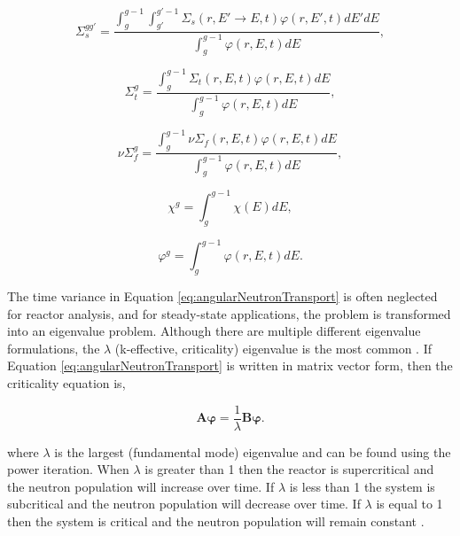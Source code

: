 \begin{equation}
    \Sigma_{s}^{gg'} = \frac{\int_{g}^{g-1}\int_{g'}^{g'-1}\Sigma_{s}(r,E'\rightarrow E,t)\varphi(r,E',t) dE'dE}{\int_{g}^{g-1}\varphi(r,E,t) dE},
\end{equation}

\begin{equation}
    \Sigma_{t}^{g} = \frac{\int_{g}^{g-1}\Sigma_{t}(r,E,t)\varphi(r,E,t) dE}{\int_{g}^{g-1}\varphi(r,E,t) dE},
\end{equation}

\begin{equation}
    \nu\Sigma_{f}^{g} = \frac{\int_{g}^{g-1}\nu\Sigma_{f}(r,E,t)\varphi(r,E,t) dE}{\int_{g}^{g-1}\varphi(r,E,t) dE},
\end{equation}

\begin{equation}
    \chi^{g} = \int_{g}^{g-1}\chi(E) dE,
\end{equation}

\begin{equation}
    \varphi^{g} = \int_{g}^{g-1}\varphi(r,E,t) dE.
\end{equation}

The time variance in Equation \ref{eq:angularNeutronTransport} is often neglected for reactor analysis, and for steady-state applications, the problem is transformed into an eigenvalue problem. Although there are multiple different eigenvalue formulations, the $\lambda$ (k-effective, criticality) eigenvalue is the most common \cite{millerCompTransport}. If Equation \ref{eq:angularNeutronTransport} is written in matrix vector form, then the criticality equation is,

\begin{equation}
    \boldsymbol{A}\boldsymbol{\varphi} = \frac{1}{\lambda}\boldsymbol{B}\boldsymbol{\varphi}.
\end{equation}

\noindent where $\lambda$ is the largest (fundamental mode) eigenvalue and can be found using the power iteration. When $\lambda$ is greater than 1 then the reactor is supercritical and the neutron population will increase over time. If $\lambda$ is less than 1 the system is subcritical and the neutron population will decrease over time. If $\lambda$ is equal to 1 then the system is critical and the neutron population will remain constant \cite{duderstadt1976}. 


